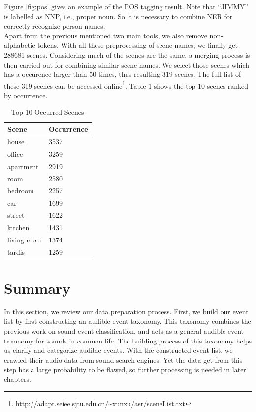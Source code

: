 Figure \ref{fig:pos} gives an example of the POS tagging result. 
Note that ``JIMMY'' is labelled as NNP, i.e., proper noun. 
So it is necessary to combine NER for correctly recognize person names. \\ 

Apart from the previous mentioned two main tools, we also remove non-alphabetic tokens. 
With all these preprocessing of scene names, we finally get 288681 scenes. 
Considering much of the scenes are the same, a merging process is then carried out for combining similar scene names. 
We select those scenes which has a occurence larger than 50 times, thus resulting 319 scenes.
The full list of these 319 scenes can be accessed online\footnote{\url{http://adapt.seiee.sjtu.edu.cn/~xunxu/asr/sceneList.txt}}. 
Table \ref{tab:top10scenes} shows the top 10 scenes ranked by occurrence. 
\begin{table}[htb]
\centering
\caption{Top 10 Occurred Scenes}
\begin{tabular}{ll}
\hline
Scene & Occurrence \\
\hline
house & 3537 \\ 
office & 3259 \\ 
apartment & 2919 \\ 
room & 2580 \\ 
bedroom & 2257 \\ 
car & 1699 \\ 
street & 1622 \\ 
kitchen & 1431 \\ 
living room & 1374 \\ 
tardis & 1259 \\ 
\hline
\end{tabular}
\label{tab:top10scenes}
\end{table}

\section{Summary}
In this section, we review our data preparation process. 
First, we build our event list by first constructing an audible event taxonomy. 
This taxonomy combines the previous work on sound event classification, and acts as a general audible event taxonomy for sounds in common life. 
The building process of this taxonomy helps us clarify and categorize audible events. 
With the constructed event list, we crawled their audio data from sound search engines. 
Yet the data get from this step has a large probability to be flawed, so further processing is needed in later chapters. 

